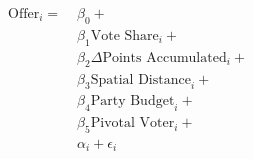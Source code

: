 \begin{equation}\label{eq:ols}
\begin{aligned}
\text{Offer}_{i} = \; & \beta_{0} + \\
                & \beta_{1}\text{Vote Share}_{i} + \\
                & \beta_{2}\Delta\text{Points Accumulated}_{i} + \\
                & \beta_{3}\text{Spatial Distance}_{i} + \\
                & \beta_{4}\text{Party Budget}_{i} + \\
                & \beta_{5}\text{Pivotal Voter}_{i} + \\
                & \alpha_{i} + \epsilon_{i}
\end{aligned}
\end{equation}